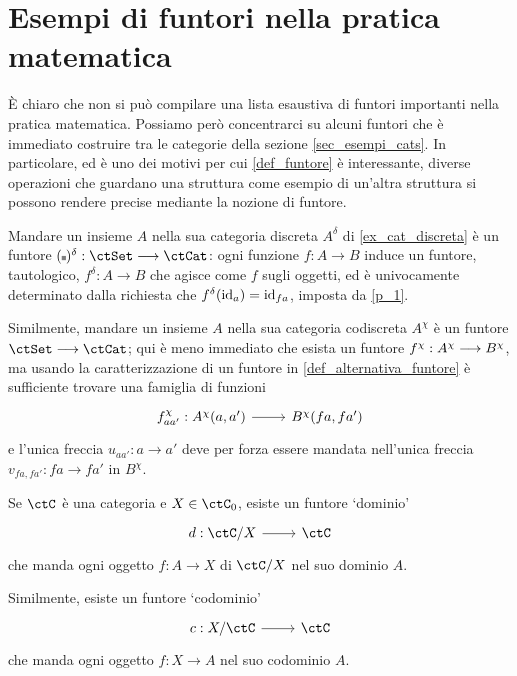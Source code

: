 \section{Esempi di funtori nella pratica matematica}\label{sec_esempi_funtori}
\`E chiaro che non si può compilare una lista esaustiva di funtori importanti nella pratica matematica. Possiamo però concentrarci su alcuni funtori che è immediato costruire tra le categorie della sezione \ref{sec_esempi_cats}. In particolare, ed è uno dei motivi per cui \ref{def_funtore} è interessante, diverse operazioni che guardano una struttura come esempio di un'altra struttura si possono rendere precise mediante la nozione di funtore.
\begin{example}\label{ex_fun_co_disc}
	Mandare un insieme \(A\) nella sua categoria discreta \(A^\delta\) di \ref{ex_cat_discreta} è un funtore \((\blank)^\delta : \ctSet \fun \ctCat\): ogni funzione \(f : A \to B\) induce un funtore, tautologico, \(f^\delta : A \to B\) che agisce come \(f\) sugli oggetti, ed è univocamente determinato dalla richiesta che \(f^\delta(\mathrm{id}_a) = \mathrm{id}_{fa}\), imposta da \ref{p_1}.

	Similmente, mandare un insieme \(A\) nella sua categoria codiscreta \(A^\chi\) è un funtore \(\ctSet \fun\ctCat\); qui è meno immediato che esista un funtore \(f^\chi : A^\chi\longrightarrow B^\chi\), ma usando la caratterizzazione di un funtore in \ref{def_alternativa_funtore} è sufficiente trovare una famiglia di funzioni
	\[\begin{tikzcd}
			f^\chi_{aa'} : \Hom{A^\chi}(a,a') \ar[r] & \Hom{B^\chi}(fa, fa')
		\end{tikzcd}\]
	e l'unica freccia \(u_{aa'} : a\to a'\) deve per forza essere mandata nell'unica freccia \(v_{fa,fa'} : fa \to fa'\) in \(B^\chi\).
\end{example}
\begin{example}\label{dom_e_cod}
	Se \(\ctC\) è una categoria e \(X\in\ctC_0\), esiste un funtore `dominio'
	\[\dmFun{d}{\ctC/X}{\ctC}\]
	che manda ogni oggetto \(f : A\to X\) di \(\ctC/X\) nel suo dominio \(A\).

	Similmente, esiste un funtore `codominio'
	\[\dmFun{c}{X/\ctC}{\ctC}\]
	che manda ogni oggetto \(f : X\to A\) nel suo codominio \(A\).
\end{example}
